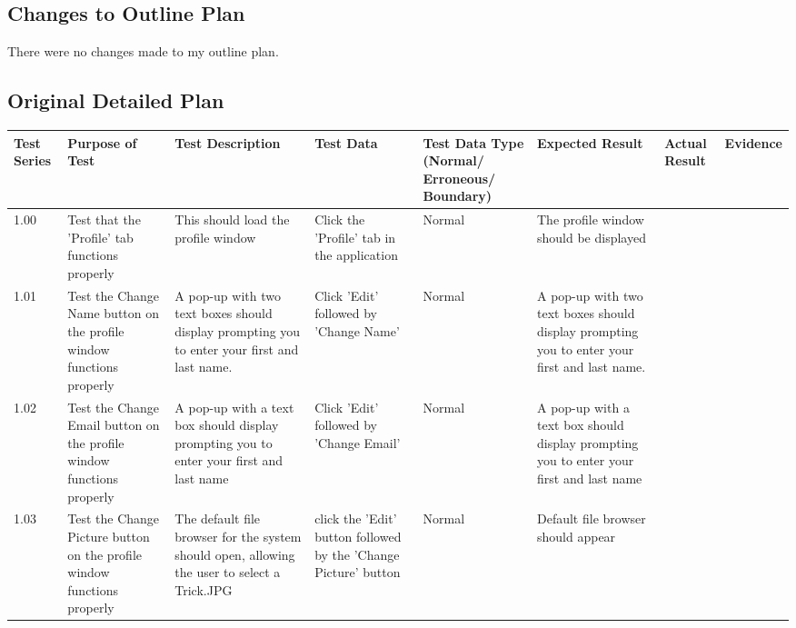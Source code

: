 \begin{landscape}
\subsection{Changes to Outline Plan}


There were no changes made to my outline plan.


\subsection{Original Detailed Plan}

\begin{center}
    \begin{longtable}{|p{1.5cm}|p{2.5cm}|p{2.5cm}|p{2cm}|p{2cm}|p{2cm}|p{2cm}|p{2cm}|}
        \hline
        \textbf{Test Series} & \textbf{Purpose of Test} & \textbf{Test Description} & \textbf{Test Data} & \textbf{Test Data Type (Normal/ Erroneous/ Boundary)} & \textbf{Expected Result} & \textbf{Actual Result} & \textbf{Evidence}\\ \hline

1.00 & Test that the 'Profile' tab functions properly & This should load the profile window & Click the 'Profile' tab in the application & Normal & The profile window should be displayed & &  \\ \hline

1.01 & Test the Change Name button on the profile window functions properly & A pop-up with two text boxes should display prompting you to enter your first and last name. &  Click 'Edit' followed by 'Change Name'  & Normal & A pop-up with two text boxes should display prompting you to enter your first and last name. & & \\ \hline

1.02 & Test the Change Email button on the profile window functions properly & A pop-up with a text box should display prompting you to enter your first and last name & Click 'Edit' followed by 'Change Email' & Normal &  A pop-up with a text box should display prompting you to enter your first and last name & &  \\ \hline

1.03 & Test the Change Picture button on the profile window functions properly &  The default file browser for the system should open, allowing the user to select a Trick.JPG & click the 'Edit' button followed by the 'Change Picture' button & Normal & Default file browser should appear & &\\ \hline




\end{longtable}
\end{center}
\end{landscape}
